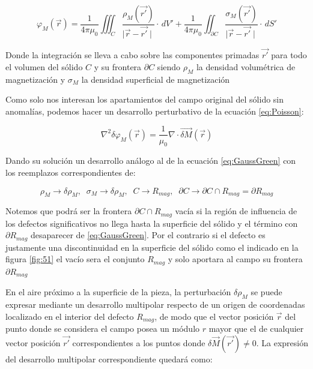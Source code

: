\begin{equation}
	\label{eq:GaussGreen}
	\varphi_{M}(\vec{r}) = \dfrac{1}{4\pi\mu_{0}}\iiint_C \dfrac{\rho_{M}(\vec{r'})}{\mid\vec{r}-\vec{r'}\mid} \cdot \,dV' + 
	\dfrac{1}{4\pi\mu_{0}}\iint_{\partial C} \dfrac{\sigma_{M}(\vec{r'})}{\mid\vec{r}-\vec{r'}\mid} \cdot \,dS'
\end{equation}

Donde la integración se lleva a cabo sobre las componentes primadas $\vec{r'}$ para todo el volumen del sólido  $C$ y su frontera ${\partial C}$ siendo $\rho_{M}$ la densidad volumétrica de magnetización y $\sigma_{M}$ la densidad superficial de magnetización

Como solo nos interesan los apartamientos del campo original del sólido sin anomalías, podemos hacer un desarrollo perturbativo\citep{PerturbationMethod}\citep{SingularPerturbation} de la ecuación \ref{eq:Poisson}:



\begin{equation}
	\label{eq:PoissonPerturbada}
	\nabla^2\delta\varphi_{M}(\vec{r}) = \dfrac{1}{\mu_{0}} \nabla \cdot\vec{\delta M}(\vec{r}) 
\end{equation}

Dando su solución un desarrollo análogo al de la ecuación \ref{eq:GaussGreen} con los reemplazos correspondientes de:

\begin{equation}
	\label{eq:GaussGreenReemplazos}
	\rho_{M}   \rightarrow \delta\rho_{M},\;\;
	\sigma_{M} \rightarrow \delta\rho_{M},\;\;	  
	C \rightarrow R_{mag}, \;\;	  
	\partial C \rightarrow \partial C \cap R_{mag} = \partial R_{mag}
\end{equation}

Notemos que podrá ser la frontera $\partial C \cap R_{mag}$ vacía si la región de influencia de los defectos significativos no llega hasta la superficie del sólido y el término con $\partial R_{mag}$ desaparecer de \ref{eq:GaussGreen}. Por el contrario si el defecto es justamente una discontinuidad en la superficie del sólido como el indicado en la figura \ref{fig:51} el vacío sera el conjunto $R_{mag}$ y solo aportara al campo su frontera $\partial R_{mag}$

En el aire próximo a la superficie de la pieza, la perturbación $\delta\rho_{M}$ se puede expresar mediante un desarrollo multipolar respecto de un origen de coordenadas localizado en el interior del defecto $R_{mag}$, de modo que el vector posición $\vec{r}$ del punto donde se considera el campo posea un módulo $r$ mayor que el de cualquier vector posición $\vec{r'}$ correspondientes a los puntos donde $\delta \vec{M}(\vec{r'}) \neq 0$. La expresión del desarrollo multipolar correspondiente quedará como:

